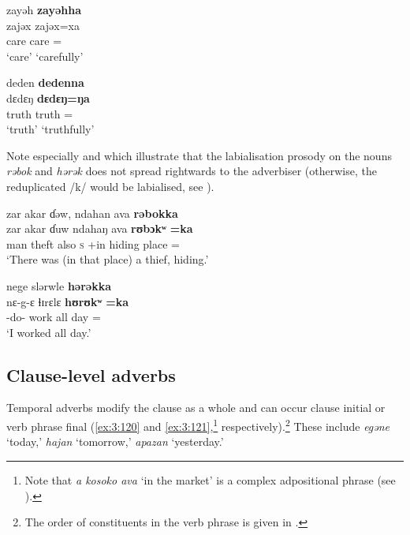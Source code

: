 \ea \label{ex:3:116}
zayəh \hspace{20pt} \textbf{zayəhha}\\
\gll  zajəx \hspace{23pt}   zajəx=xa\\
      care  \hspace{23pt}    {care     ={\ADV}}\\
\glt  ‘care’  \hspace{21pt}  ‘carefully’
\z

\ea \label{ex:3:117}
deden  \hspace{20pt}  \textbf{dedenna}\\
\gll  dɛdɛŋ   \hspace{22pt} \textbf{dɛdɛŋ=ŋa}\\
      truth  \hspace{22pt}  {truth    ={\ADV}}\\
\glt  ‘truth’  \hspace{20pt}  ‘truthfully’  
\z

Note especially  and  which illustrate that the labialisation prosody on the nouns \textit{rəbok}  and \textit{hərək}  does not spread rightwards to the adverbiser (otherwise, the reduplicated /k/ would be labialised, see ). 

\ea \label{ex:3:118}
zar  akar  ɗəw,  ndahan  ava  \textbf{rəbokka}\\
\gll  zar     akar  ɗuw  ndahaŋ  ava  \textbf{rʊbɔkʷ} \textbf{=ka}\\
      man    theft  also  \textsc{s}  {\EXT}{}+in  {hiding place}  ={\ADV}\\
\glt  ‘There was (in that place) a thief, hiding.’ 
\z

\ea \label{ex:3:119}
nege  slərwle  \textbf{hərəkka}\\
\gll  nɛ-g-ɛ  ɬɪrɛlɛ  \textbf{hʊrʊkʷ} \textbf{=ka}\\
      {\oneS}-do-{\CL}  work  {all day}  ={\ADV}\\
\glt  ‘I worked all day.’
\z

\subsection{Clause-level adverbs}\label{sec:3.5.3}
\hypertarget{RefHeading1211201525720847}{}
Temporal adverbs modify the clause as a whole and can occur clause initial or verb phrase final (\ref{ex:3:120} and \ref{ex:3:121},\footnote{Note that \textit{a kosoko ava} ‘in the market’ is a complex adpositional phrase (see ).} respectively).\footnote{The order of constituents in the verb phrase is given in .} These include \textit{egəne} ‘today,’ \textit{hajan} ‘tomorrow,’ \textit{apazan} ‘yesterday.’ 

